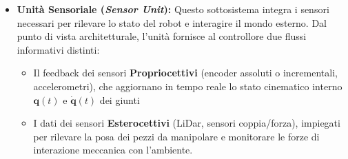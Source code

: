 ﻿\documentclass[11pt, a4paper]{article}
\begin{document}
\begin{itemize}
    La catena di attuazione è composta da:
    \begin{itemize}
        \item \textbf{Motori Elettrici Brushless:} Che convertono l'energia elettrica in energia meccanica e caratterizzati dall'assenza di spazzole e da un elevato rapporto coppia/inerzia
        \item \textbf{Trasmissioni Meccaniche:} Ad esempio riduttori epicicloidali o cicloidali, utilizzati per adattare velocità e coppia del motore alle specifiche del giunto.
        \item \textbf{Elettronica Di Potenza:} Consente di regolare la corrente e la tensione applicate al motore, necessarie per il controllo della coppia e della velocità.
    \end{itemize}
    \newpage

    \item \textbf{Unità Sensoriale (\textit{Sensor Unit}):}
    Questo sottosistema integra i sensori necessari per rilevare lo stato del robot e interagire il mondo esterno. Dal punto di vista architetturale, l'unità fornisce al controllore due flussi informativi distinti:
    \begin{itemize}
        \item Il feedback dei sensori \textbf{Propriocettivi} (encoder assoluti o incrementali, accelerometri), che aggiornano in tempo reale lo stato cinematico interno $\boldsymbol{q}(t)$ e $\dot{\boldsymbol{q}}(t)$ dei giunti
        \item I dati dei sensori \textbf{Esterocettivi} (LiDar, sensori coppia/forza), impiegati per rilevare la posa dei pezzi da manipolare e monitorare le forze di interazione meccanica con l'ambiente.
    \end{itemize}


\end{itemize}
\end{document}
